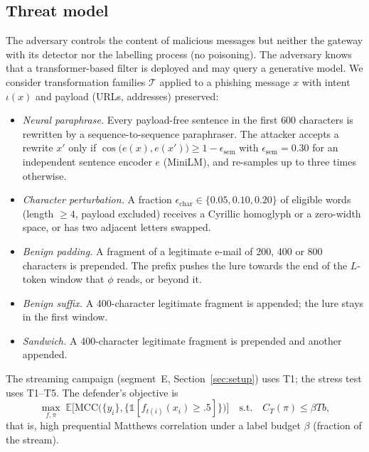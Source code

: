 \subsection{Threat model}\label{sec:threat}
The adversary controls the content of malicious messages but neither the gateway with its detector nor the labelling process (no poisoning). The adversary knows that a transformer-based filter is deployed and may query a generative model. We consider transformation families $\mathcal{T}$ applied to a phishing message $x$ with intent $\iota(x)$ and payload (URLs, addresses) preserved:
\begin{itemize}
\item[T1] \emph{Neural paraphrase.} Every payload-free sentence in the first $600$ characters is rewritten by a sequence-to-sequence paraphraser. The attacker accepts a rewrite $x'$ only if $\cos\big(e(x),e(x')\big)\ge 1-\epsilon_{\mathrm{sem}}$ with $\epsilon_{\mathrm{sem}}=0.30$ for an independent sentence encoder $e$ (MiniLM), and re-samples up to three times otherwise.
\item[T2] \emph{Character perturbation.} A fraction $\epsilon_{\mathrm{char}}\in\{0.05,0.10,0.20\}$ of eligible words (length $\ge 4$, payload excluded) receives a Cyrillic homoglyph or a zero-width space, or has two adjacent letters swapped.
\item[T3] \emph{Benign padding.} A fragment of a legitimate e-mail of 200, 400 or 800 characters is prepended. The prefix pushes the lure towards the end of the $L$-token window that $\phi$ reads, or beyond it.
\item[T4] \emph{Benign suffix.} A 400-character legitimate fragment is appended; the lure stays in the first window.
\item[T5] \emph{Sandwich.} A 400-character legitimate fragment is prepended and another appended.
\end{itemize}
The streaming campaign (segment~E, Section~\ref{sec:setup}) uses T1; the stress test uses T1--T5. The defender's objective is
\begin{equation}
\max_{f,\pi}\;\mathbb{E}\Big[\mathrm{MCC}\big(\{y_i\},\{\mathbb{1}[f_{t(i)}(x_i)\ge .5]\}\big)\Big]\quad\text{s.t.}\quad C_T(\pi)\le \beta T b ,
\label{eq:objective}
\end{equation}
that is, high prequential Matthews correlation under a label budget $\beta$ (fraction of the stream).
